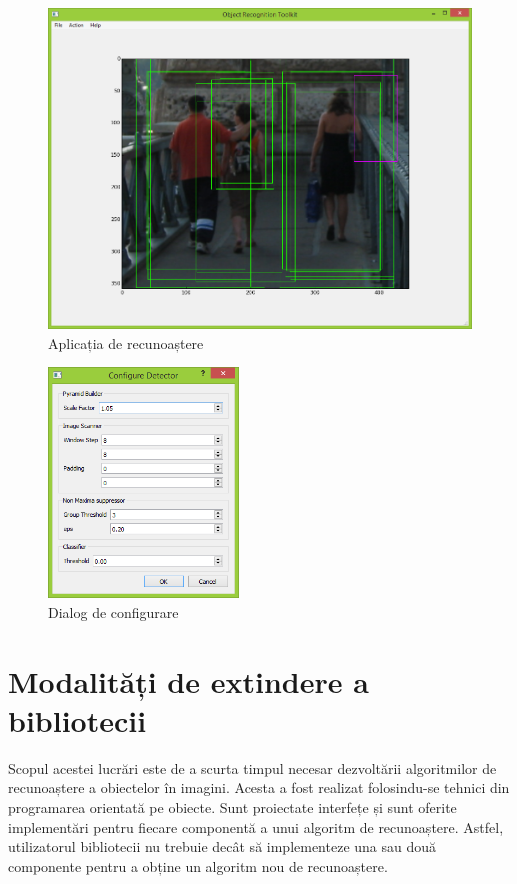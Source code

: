 \begin{figure}[H]
	\centering
		\includegraphics[width=1.00\textwidth]{imagini/aplicatia.png}
	\caption{Aplicația de recunoaștere}
	\label{fig:aplicatia}
\end{figure}

\begin{figure}[H]
	\centering
		\includegraphics[width=0.45\textwidth]{imagini/dialog_configurare.png}
	\caption{Dialog de configurare}
	\label{fig:dialog_configurare}
\end{figure}


\section{Modalități de extindere a bibliotecii}

Scopul acestei lucrări este de a scurta timpul necesar dezvoltării algoritmilor de recunoaștere a obiectelor în imagini.
Acesta a fost realizat folosindu-se tehnici din programarea orientată pe obiecte.
Sunt proiectate interfețe și sunt oferite implementări pentru fiecare componentă a unui algoritm de recunoaștere.
Astfel, utilizatorul bibliotecii nu trebuie decât să implementeze una sau două componente pentru a obține un algoritm nou de recunoaștere.

